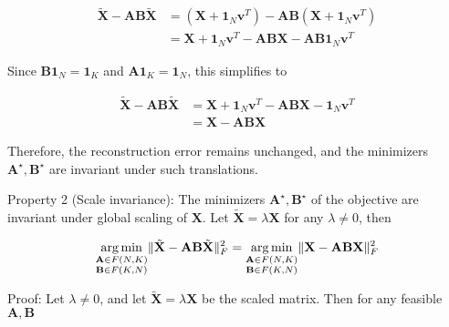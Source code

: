 \documentclass[oneside]{article}
\begin{document}
\begin{equation}
    \begin{aligned}
    \tilde{\mathbf{X}} - \mathbf{A} \mathbf{B} \tilde{\mathbf{X}} 
    &= \left(\mathbf{X} + \mathbf{1}_N \mathbf{v}^T \right) - \mathbf{A} \mathbf{B} \left(\mathbf{X} + \mathbf{1}_N \mathbf{v}^T \right) \\
    &= \mathbf{X} + \mathbf{1}_N \mathbf{v}^T - \mathbf{A} \mathbf{B} \mathbf{X} -  \mathbf{A} \mathbf{B} \mathbf{1}_N \mathbf{v}^T
    \end{aligned}
\end{equation}

Since $\mathbf{B} \mathbf{1}_N = \mathbf{1}_K$ and  $\mathbf{A} \mathbf{1}_K = \mathbf{1}_N$, this simplifies to 

\begin{equation}
    \begin{aligned}
    \tilde{\mathbf{X}} - \mathbf{A} \mathbf{B} \tilde{\mathbf{X}}
    &= \mathbf{X} + \mathbf{1}_N \mathbf{v}^T - \mathbf{A} \mathbf{B} \mathbf{X} - \mathbf{1}_N \mathbf{v}^T \\
    &= \mathbf{X} - \mathbf{A} \mathbf{B} \mathbf{X}
    \end{aligned}
\end{equation}

Therefore, the reconstruction error remains unchanged, and the minimizers $\mathbf{A}^\star, \mathbf{B}^\star$ are invariant under such translations.

Property 2 (Scale invariance): The minimizers $\mathbf{A}^\star, \mathbf{B}^\star$ of the objective are invariant under global scaling of $\mathbf{X}$. Let $\tilde{\mathbf{X}} = \lambda \mathbf{X}$ for any $\lambda \neq 0$, then

\begin{equation}
    \underset{\begin{subarray}{c} \mathbf{A} \in F(N, K) \\ \mathbf{B} \in F(K, N) \end{subarray}}{\arg \min} \| \tilde{\mathbf{X}} - \mathbf{A} \mathbf{B} \tilde{\mathbf{X}} \|_F^2 
    = 
    \underset{\begin{subarray}{c} \mathbf{A} \in F(N, K) \\ \mathbf{B} \in F(K, N) \end{subarray}}{\arg \min} \| \mathbf{X} - \mathbf{A} \mathbf{B} \mathbf{X}\|_F^2 
\end{equation}

Proof: Let $\lambda \neq 0$, and let $\tilde{\mathbf{X}} = \lambda \mathbf{X}$ be the scaled matrix. Then for any feasible $\mathbf{A}, \mathbf{B}$
\end{document}

